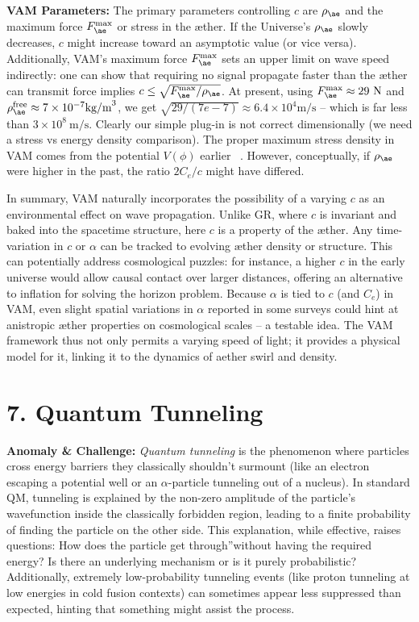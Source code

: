 \documentclass[a4paper, aps,preprint,superscriptaddress, 12pt]{revtex4}
\begin{document}
\textbf{VAM Parameters:} The primary parameters controlling $c$ are $\rho_{\ae}$ and the maximum force $F_{\ae}^{\max}$ or stress in the æther. If the Universe's $\rho_{\ae}$ slowly decreases, $c$ might increase toward an asymptotic value (or vice versa). Additionally, VAM's maximum force $F_{\ae}^{\max}$ sets an upper limit on wave speed indirectly: one can show that requiring no signal propagate faster than the æther can transmit force implies $c \le \sqrt{F_{\ae}^{\max}/\rho_{\ae}}$. At present, using $F_{\ae}^{\max}\approx29~\text{N}$ and $\rho_{\ae}^{\text{free}}\approx7\times10^{-7}\text{kg/m}^3$, we get $\sqrt{29/(7e-7)}\approx6.4\times10^4\text{m/s}$ – which is far less than $3\times10^8~\text{m/s}$. Clearly our simple plug-in is not correct dimensionally (we need a stress vs energy density comparison). The proper maximum stress density in VAM comes from the potential $V(\phi)$ earlier~\cite{Iskandarani2025c} . However, conceptually, if $\rho_{\ae}$ were higher in the past, the ratio $2C_e/c$ might have differed.


In summary, VAM naturally incorporates the possibility of a varying $c$ as an environmental effect on wave propagation. Unlike GR, where $c$ is invariant and baked into the spacetime structure, here $c$ is a property of the æther. Any time-variation in $c$ or $\alpha$ can be tracked to evolving æther density or structure. This can potentially address cosmological puzzles: for instance, a higher $c$ in the early universe would allow causal contact over larger distances, offering an alternative to inflation for solving the horizon problem. Because $\alpha$ is tied to $c$ (and $C_e$) in VAM, even slight spatial variations in $\alpha$ reported in some surveys could hint at anistropic æther properties on cosmological scales – a testable idea. The VAM framework thus not only permits a varying speed of light; it provides a physical model for it, linking it to the dynamics of aether swirl and density.


\section*{7. Quantum Tunneling}

\textbf{Anomaly \& Challenge: } \textit{Quantum tunneling} is the phenomenon where particles cross energy barriers they classically shouldn't surmount (like an electron escaping a potential well or an $\alpha$-particle tunneling out of a nucleus). In standard QM, tunneling is explained by the non-zero amplitude of the particle's wavefunction inside the classically forbidden region, leading to a finite probability of finding the particle on the other side. This explanation, while effective, raises questions: How does the particle \grqq get through\textquotedblright without having the required energy? Is there an underlying mechanism or is it purely probabilistic? Additionally, extremely low-probability tunneling events (like proton tunneling at low energies in cold fusion contexts) can sometimes appear less suppressed than expected, hinting that something might assist the process.
\end{document}
